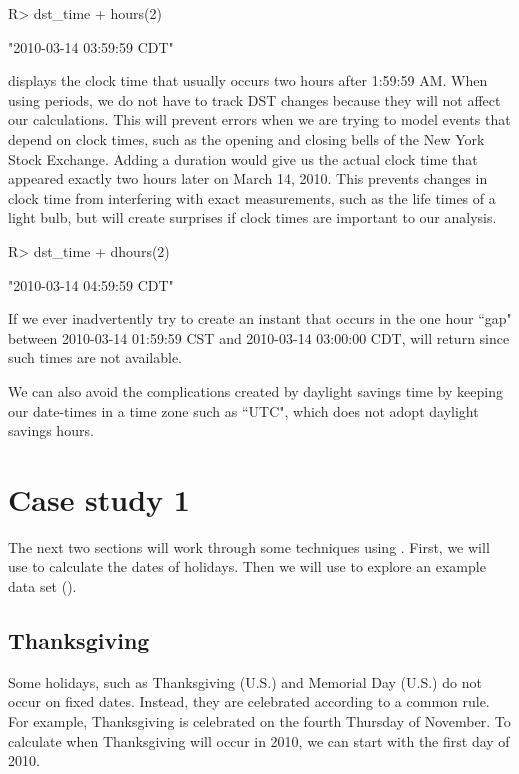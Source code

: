 \documentclass[article]{jss}
\begin{document}
\begin{CodeInput}
R> dst_time + hours(2)
\end{CodeInput}
\begin{CodeOutput}
[1] "2010-03-14 03:59:59 CDT"
\end{CodeOutput}

displays the clock time that usually occurs two hours after 1:59:59 AM. When using periods, we do not have to track DST changes because they will not affect our calculations. This will prevent errors when we are trying to model events that depend on clock times, such as the opening and closing bells of the New York Stock Exchange.
Adding a duration would give us the actual clock time that appeared exactly two hours later on March 14, 2010. This prevents changes in clock time from interfering with exact measurements, such as the life times of a light bulb, but will create surprises if clock times are important to our analysis.

\begin{CodeInput}
R> dst_time + dhours(2)
\end{CodeInput}
\begin{CodeOutput}
[1] "2010-03-14 04:59:59 CDT"
\end{CodeOutput}

If we ever inadvertently try to create an instant that occurs in the one hour ``gap" between 2010-03-14 01:59:59 CST  and 2010-03-14 03:00:00 CDT,  will return  since such times are not available.

We can also avoid the complications created by daylight savings time by keeping our date-times in a time zone such as ``UTC", which does not adopt daylight savings hours.

\section{Case study 1}

The next two sections will work through some techniques using . First, we will use  to calculate the dates of  holidays. Then we will use  to explore an example data set ().

\subsection{Thanksgiving}
Some holidays, such as Thanksgiving (U.S.) and Memorial Day (U.S.) do not occur on fixed dates. Instead, they are celebrated according to a common rule. For example, Thanksgiving is celebrated on the fourth Thursday of November. To calculate when Thanksgiving will occur in 2010, we can start with the first day of 2010.
\end{document}
